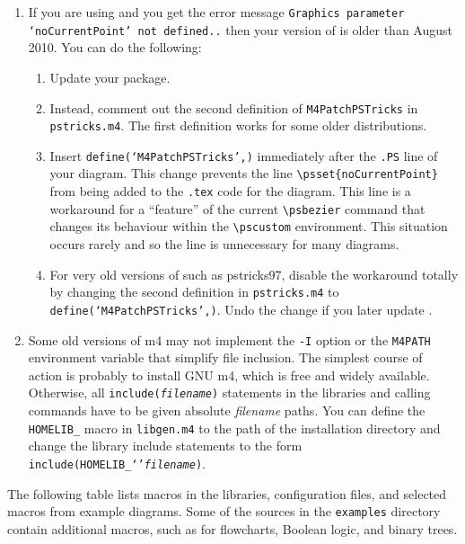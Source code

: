 \begin{enumerate}
\item
{}
 If you are using \PSTricks and
  you get the error message {\tt Graphics parameter `noCurrentPoint'
  not defined..} then your version of \PSTricks is older than
  August 2010.  You can do the following:
\begin{enumerate}
\item Update your \PSTricks package.
\item Instead, comment out the second definition of {\tt M4PatchPSTricks} in
  {\tt pstricks.m4}.  The first definition works for some older
  \PSTricks distributions.
\item Insert {\tt define(`M4PatchPSTricks',)} immediately after the
   {\tt .PS} line of your diagram.
  This change prevents the line
  \verb|\psset{noCurrentPoint}| from being added to the {\tt .tex}
  code for the diagram.  This line is a workaround for a ``feature''
  of the current \PSTricks \verb|\psbezier| command that changes its
  behaviour within the \verb|\pscustom| environment.  This situation
  occurs rarely and so the line is unnecessary for many diagrams.
\item For very old versions of \PSTricks such as pstricks97, disable the
  workaround totally by changing the second definition in {\tt pstricks.m4}
  to {\tt define(`M4PatchPSTricks',)}.  Undo the change if you later update
  \PSTricks.
  \end{enumerate}

\item
{}\label{Mfourerror:}
  Some old versions of m4 may not implement
  the {\tt -I} option or the {\tt M4PATH} environment variable that
  simplify file inclusion.
  The simplest course of action is probably to install GNU m4, which is
  free and widely available. 
  Otherwise, all {\tt include({\sl filename})} statements in the libraries and
  calling commands have to be given absolute {\sl filename} paths. 
  You can define the {\tt HOMELIB\_} macro in {\tt libgen.m4} to the
  path of the installation directory and change the library
  include statements to the form {\tt include(HOMELIB\_`'{\sl filename})}.

\end{enumerate}

\label{defines}
The following table lists macros in the libraries, configuration
files, and selected macros from example diagrams.  Some of the sources
in the {\tt examples} directory contain
additional macros, such as for flowcharts, Boolean logic, and binary
trees.

